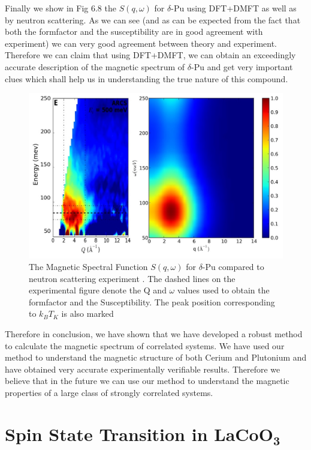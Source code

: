 \documentclass[10pt]{ruthesis}
\begin{document}
{Finally we show in Fig 6.8 the $S(q,\omega)$ for $\delta$-Pu using DFT+DMFT as well as by neutron scattering. As we can see (and as can be expected from the fact that both the formfactor and the susceptibility are in good agreement with experiment) we can very good agreement between theory and experiment. Therefore we can claim that using DFT+DMFT, we can obtain an exceedingly accurate description of the magnetic spectrum of $\delta$-Pu and get very important clues which shall help us in understanding the true nature of this compound.
\begin{figure}[H]
\begin{center}
\includegraphics[width=\columnwidth]{Sq_Pu_joined.jpg}
\caption{ The Magnetic Spectral Function $S(q,\omega)$  for $\delta$-Pu compared to neutron scattering experiment \cite{Me_Pu}. The dashed lines on the experimental figure denote the Q and $\omega$ values used to obtain the formfactor and the Susceptibility. The peak position corresponding to $k_B T_K$ is also marked \label{Sq_Pu_fig} }
\end{center}

\end{figure}


Therefore in conclusion, we have shown that we have developed a robust method to calculate the magnetic spectrum of correlated systems. We have used our method to understand the magnetic structure of both Cerium and Plutonium and have obtained very accurate experimentally verifiable results. Therefore we believe that in the future we can use our method to understand the magnetic properties of a large class of strongly correlated systems.



\pagebreak
\chapter{Spin State Transition in $\mathbf{LaCoO_3}$}

}
\end{document}

